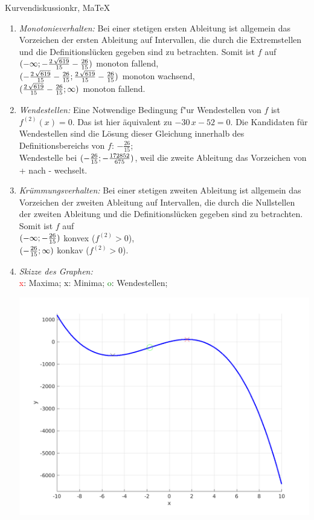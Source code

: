 \begin{MAufgabe}{Kurvendiskussion}{kr, MaTeX}
\begin{enumerate}
 \item \emph{Monotonieverhalten:} 
 Bei einer stetigen ersten Ableitung ist allgemein das Vorzeichen der ersten Ableitung auf Intervallen, die durch die Extremstellen und die Definitionsl\"ucken gegeben sind zu betrachten. Somit ist $f$ auf \\ 
 $(-\infty; - \frac{2\, \sqrt{619}}{15} - \frac{26}{15})$ monoton fallend, \\ 
 $( - \frac{2\, \sqrt{619}}{15} - \frac{26}{15};\frac{2\, \sqrt{619}}{15} - \frac{26}{15})$ monoton  wachsend, \\ 
 $(\frac{2\, \sqrt{619}}{15} - \frac{26}{15}; \infty)$ monoton fallend. \\ 
 \item \emph{Wendestellen:} 
 Eine Notwendige Bedingung f"ur Wendestellen von $f$ ist $f^{(2)}(x)=0$. 
 Das ist hier \"aquivalent zu $ - 30\, x - 52=0$. 
 Die Kandidaten f\"ur Wendestellen sind die L\"osung dieser Gleichung innerhalb des Definitionsbereichs von $f$: $- \frac{26}{15}$; \\ 
 Wendestelle bei $(- \frac{26}{15};- \frac{172852}{675})$, weil die zweite Ableitung das Vorzeichen von + nach - wechselt. \\ 
 \item \emph{Kr\"ummungsverhalten:} 
 Bei einer stetigen zweiten Ableitung ist allgemein das Vorzeichen der zweiten Ableitung auf Intervallen, die durch die Nullstellen der zweiten Ableitung und die Definitionsl\"ucken gegeben sind zu betrachten. 
 Somit ist $f$ auf \\ 
 $(-\infty ;- \frac{26}{15})$  konvex ($f^{(2)}>0$), \\ 
 $(- \frac{26}{15}; \infty)$  konkav ($f^{(2)}>0$). \\ 
 \item \emph{Skizze des Graphen:} \\ 
 {\textcolor{red} x}: Maxima; {\textcolor{black} x}: Minima; {\textcolor{green} o}: Wendestellen; 
  \begin{center}
  \includegraphics[width=0.8\linewidth]{Abb_zur_Ag_autogenerated_fractions_43.png} \end{center}
  
 \end{enumerate}
 \else\relax\fi
  \end{MAufgabe}